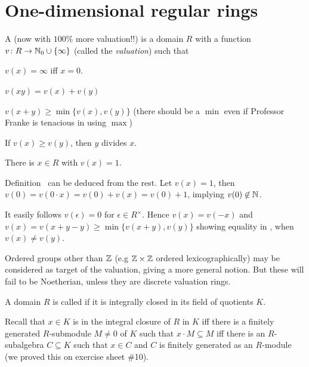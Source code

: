 \documentclass[a4paper,parskip=half,numbers=enddot, DIV=12]{scrreprt}
\begin{document}
\section{One-dimensional regular rings}

\begin{defi}
    A  (now with $100\%$ more valuation!!) is a domain $R$ with a function $v\colon R\morphism \IN_0\cup\{\infty\}$ (called the \emph{valuation}) such that
    \begin{alphanumerate}
    \item 
        $v(x)=\infty$ iff $x = 0$.
    \item 
        $v(xy) = v(x) + v(y)$
    \item 
        $v(x+y) \geq \min\{v(x), v(y)\}$ (there should be a $\min$ even if Professor Franke is tenacious in using $\max$)
    \item 
        If $v(x)\geq v(y)$, then $y$ divides $x$. 
    \item 
        There is $x\in R$ with $v(x) = 1$.
    \end{alphanumerate}
\end{defi}
\begin{rem}
    \begin{alphanumerate}
    \item 
        Definition~ can be deduced from the rest. Let $v(x) = 1$, then $v(0) = v(0\cdot x) = v(0) + v(x) = v(0) +1$, implying $v(0)\not \in \mathbb{N}$. 
    \item 
        It easily follows $v(\epsilon) = 0$ for $\epsilon \in R^\times$. Hence $v(x) = v(-x)$ and $v(x) = v(x+y-y) \geq \min\{v(x+y), v(y)\}$ showing equality in , when $v(x) \neq v(y)$.
    \item 
        Ordered groups other than $\mathbb{Z}$ (e.g $\mathbb{Z}\times \mathbb{Z}$ ordered lexicographically) may be considered as target of the valuation, giving a more general notion. But these will fail to be Noetherian, unless they are discrete valuation rings.
    \end{alphanumerate}
\end{rem}
\begin{defi}
    A domain $R$ is called  if it is integrally closed in its field of quotients $K$. 
\end{defi}
Recall that $x\in K$ is in the integral closure of $R$ in $K$ iff there is a finitely generated $R$-submodule $M\neq 0$ of $K$ such that $x\cdot M\subseteq M$  iff there is an $R$-subalgebra $C\subseteq K$ such that $x\in C$ and $C$ is finitely generated as an $R$-module (we proved this on exercise sheet \#10).
\end{document}
